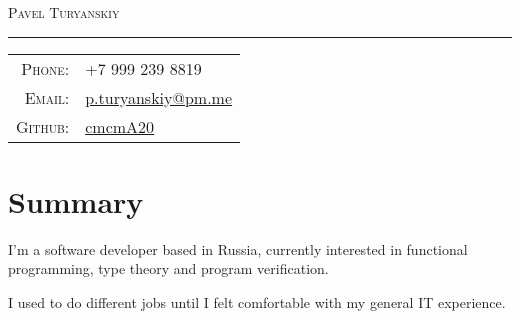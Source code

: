 \documentclass[a4paper,11pt]{article}
\begin{document}
  \begin{center}
    \Huge \textsc{Pavel Turyanskiy}
  \end{center}

  \hrule
  \vspace{0.5em}

  \begin{tabular}{rl}
    \textsc{Phone:}  & +7 999 239 8819                                      \\
    \textsc{Email:}  & \href{mailto:p.turyanskiy@pm.me}{p.turyanskiy@pm.me} \\
    \textsc{Github:} & \href{https://github.com/cmcmA20}{cmcmA20}           \\
  \end{tabular}

  \section{Summary}
    I'm a software developer based in Russia, currently interested in functional programming, type theory and
    program verification.

    I used to do different jobs until I felt comfortable with my general IT experience.
\end{document}
